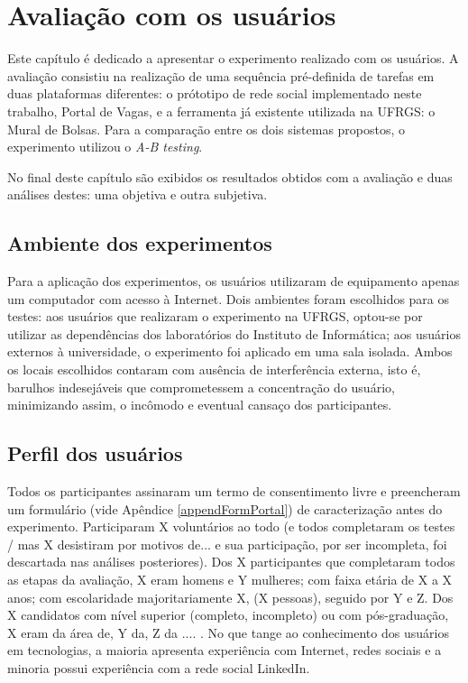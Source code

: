\documentclass[cic,tc]{iiufrgs}
\begin{document}
\chapter{Avaliação com os usuários}
\label{Avaliação}

Este capítulo é dedicado a apresentar o experimento realizado com os usuários.  A avaliação consistiu na realização de uma sequência pré-definida de tarefas em duas plataformas diferentes: o prótotipo de rede social implementado neste trabalho, Portal de Vagas, e a ferramenta já existente utilizada na UFRGS: o Mural de Bolsas. Para a comparação entre os dois sistemas propostos, o experimento utilizou o \textit{A-B testing}. 

No final deste capítulo são exibidos os resultados obtidos com a avaliação e duas análises destes: uma objetiva e outra subjetiva.

\section{Ambiente dos experimentos}
\label{avaliacaoAmbiente}

Para a aplicação dos experimentos, os usuários utilizaram de equipamento apenas um computador com acesso à Internet. Dois ambientes foram escolhidos para os testes: aos usuários que realizaram o experimento na UFRGS, optou-se por utilizar as dependências dos laboratórios do Instituto de Informática; aos usuários externos à universidade, o experimento foi aplicado em uma sala isolada. Ambos os locais escolhidos contaram com ausência de interferência externa, isto é, barulhos indesejáveis que comprometessem a concentração do usuário, minimizando assim, o incômodo e eventual cansaço dos participantes.

\section{Perfil dos usuários}
\label{avaliacaoPefil}

Todos os participantes assinaram um termo de consentimento livre e preencheram um formulário (vide Apêndice \ref{appendFormPortal}) de caracterização antes do experimento. Participaram X voluntários ao todo (e todos completaram os testes / mas X desistiram por motivos de... e sua participação, por ser incompleta, foi descartada nas análises posteriores). Dos X participantes que completaram todos as etapas da avaliação, X eram homens e Y mulheres; com faixa etária de X a X anos; com escolaridade majoritariamente X, (X pessoas), seguido por Y e Z. Dos X candidatos com nível superior (completo, incompleto) ou com pós-graduação, X eram da área de, Y da, Z da .... . No que tange ao conhecimento dos usuários em tecnologias, a maioria apresenta experiência com Internet, redes sociais e a minoria possui experiência com a rede social LinkedIn.
\end{document}
